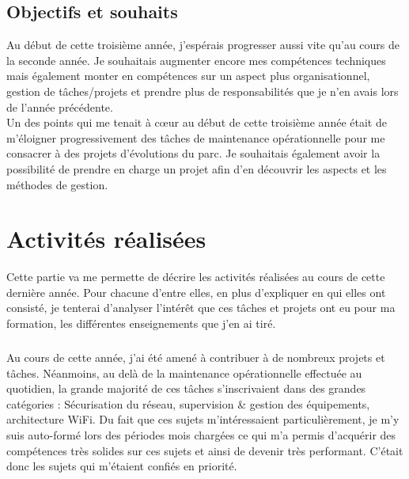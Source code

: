 \documentclass[a4paper,12pt]{report}
\begin{document}
\section{Objectifs et souhaits} %
Au début de cette troisième année, j'espérais progresser aussi vite qu'au cours de la seconde année. Je souhaitais augmenter encore mes compétences techniques mais également monter en compétences sur un aspect plus organisationnel, gestion de tâches/projets et prendre plus de responsabilités que je n'en avais lors de l'année précédente.\\
Un des points qui me tenait à cœur au début de cette troisième année était de m'éloigner progressivement des tâches de maintenance opérationnelle pour me consacrer à des projets d'évolutions du parc. Je souhaitais également avoir la possibilité de prendre en charge un projet afin d'en découvrir les aspects et les méthodes de gestion.


\chapter{Activités réalisées}
Cette partie va me permette de décrire les activités réalisées au cours de cette dernière année. Pour chacune d'entre elles, en plus d'expliquer en qui elles ont consisté, je tenterai d'analyser l'intérêt que ces tâches et projets ont eu pour ma formation, les différentes enseignements que j'en ai tiré.
\paragraph{}
Au cours de cette année, j'ai été amené à contribuer à de nombreux projets et tâches. Néanmoins, au delà de la maintenance opérationnelle effectuée au quotidien, la grande majorité de ces tâches s'inscrivaient dans des grandes catégories : Sécurisation du réseau, supervision \& gestion des équipements, architecture WiFi. Du fait que ces sujets m'intéressaient particulièrement, je m'y suis auto-formé lors des périodes mois chargées ce qui m'a permis d'acquérir des compétences très solides sur ces sujets et ainsi de devenir très performant. C'était donc les sujets qui m'étaient confiés en priorité.
\end{document}
